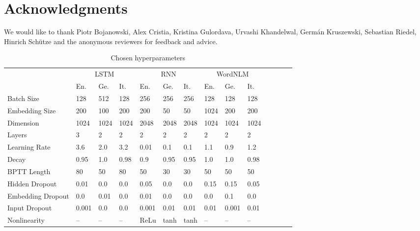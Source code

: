 










\section*{Acknowledgments}

We would like to thank Piotr Bojanowski, Alex Cristia, Kristina
Gulordava, Urvashi Khandelwal, Germ\'{a}n Kruszewski, Sebastian
Riedel, Hinrich Sch\"{u}tze and the anonymous reviewers for feedback
and advice.








 \appendix

 \begin{table*}[t]
 	\begin{tabular}{l|lll|lll|lllllll}
 		&  \multicolumn{3}{c}{LSTM} & \multicolumn{3}{|c|}{RNN} & \multicolumn{3}{c}{WordNLM} \\
 		       &  En.     &  Ge.    & It.    & En.    &    Ge.   &  It.     &  En.     &   Ge.   &    It. \\  \hline
 	Batch Size     &  128   &  512  & 128  & 256  & 256    &  256   &  128   &   128 &  128   \\              
 	Embedding Size &  200   &  100  & 200  & 200  & 50     &  50    &  1024  &   200 &  200   \\             
 	Dimension      &  1024  &  1024 & 1024 & 2048 & 2048   &  2048  &  1024  &  1024 &  1024  \\  
 	Layers         &  3     &  2    & 2    & 2    & 2      &  2     &  2     &  2    &  2     \\   
 	Learning Rate  &  3.6   &  2.0  & 3.2  & 0.01 & 0.1    &  0.1   &  1.1   &  0.9  &  1.2   \\ 
 	Decay          &  0.95  &  1.0  & 0.98 & 0.9  & 0.95   &  0.95  &  1.0   &  1.0  &  0.98  \\
 	BPTT Length    &  80    &  50   & 80   & 50   & 30     &  30    &  50    &  50   &  50    \\
 	Hidden Dropout &  0.01  &  0.0  & 0.0  & 0.05 & 0.0    &  0.0   &  0.15  &  0.15 &  0.05  \\   
 	Embedding Dropout  & 0.0& 0.01  & 0.0  & 0.01 & 0.0    &  0.0   &  0.0   &  0.1  &  0.0   \\   
 	Input Dropout  & 0.001 &  0.0   & 0.0  & 0.001& 0.01   &  0.01  &  0.01  &  0.001&  0.01  \\ 
         Nonlinearity   &   --  & --     & --   & ReLu & tanh   &  tanh  &   --   &  --   &  --    \\                   
 \end{tabular}
 	\caption{Chosen hyperparameters}
 \end{table*}






